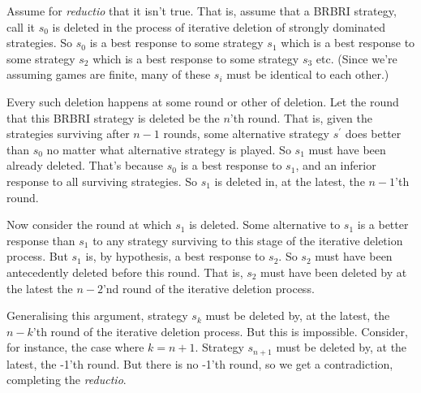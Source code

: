 {{Assume for \textit{reductio} that it isn't true. That is, assume that a BRBRI strategy, call it $s_0$ is deleted in the process of iterative deletion of strongly dominated strategies. So $s_0$ is a best response to some strategy $s_1$ which is a best response to some strategy $s_2$ which is a best response to some strategy $s_3$ etc. (Since we're assuming games are finite, many of these $s_i$ must be identical to each other.)

Every such deletion happens at some round or other of deletion. Let the round that this BRBRI strategy is deleted be the $n$'th round. That is, given the strategies surviving after $n-1$ rounds, some alternative strategy $s^\prime$ does better than $s_0$ no matter what alternative strategy is played. So $s_1$ must have been already deleted. That's because $s_0$ is a best response to $s_1$, and an inferior response to all surviving strategies. So $s_1$ is deleted in, at the latest, the $n-1$'th round.

Now consider the round at which $s_1$ is deleted. Some alternative to $s_1$ is a better response than $s_1$ to any strategy surviving to this stage of the iterative deletion process. But $s_1$ is, by hypothesis, a best response to $s_2$. So $s_2$ must have been antecedently deleted before this round. That is, $s_2$ must have been deleted by at the latest the $n-2$'nd round of the iterative deletion process.

Generalising this argument, strategy $s_k$ must be deleted by, at the latest, the $n-k$'th round of the iterative deletion process. But this is impossible. Consider, for instance, the case where $k = n+1$. Strategy $s_{n+1}$ must be deleted by, at the latest, the -1'th round. But there is no -1'th round, so we get a contradiction, completing the \textit{reductio}.
}


}


